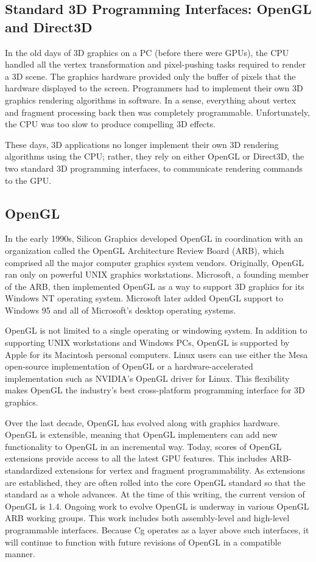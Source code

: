 \documentclass[../main.tex]{subfiles}
\begin{document}
\subsection{Standard 3D Programming Interfaces: OpenGL and Direct3D}

In the old days of 3D graphics on a PC (before there were GPUs), the CPU handled all the vertex transformation and pixel-pushing tasks required to render a 3D scene. The graphics hardware provided only the buffer of pixels that the hardware displayed to the screen. Programmers had to implement their own 3D graphics rendering algorithms in software. In a sense, everything about vertex and fragment processing back then was completely programmable. Unfortunately, the CPU was too slow to produce compelling 3D effects.

These days, 3D applications no longer implement their own 3D rendering algorithms using the CPU; rather, they rely on either OpenGL or Direct3D, the two standard 3D programming interfaces, to communicate rendering commands to the GPU.

\subsection*{OpenGL}
In the early 1990s, Silicon Graphics developed OpenGL in coordination with an organization called the OpenGL Architecture Review Board (ARB), which comprised all the major computer graphics system vendors. Originally, OpenGL ran only on powerful UNIX graphics workstations. Microsoft, a founding member of the ARB, then implemented OpenGL as a way to support 3D graphics for its Windows NT operating system. Microsoft later added OpenGL support to Windows 95 and all of Microsoft's desktop operating systems.

OpenGL is not limited to a single operating or windowing system. In addition to supporting UNIX workstations and Windows PCs, OpenGL is supported by Apple for its Macintosh personal computers. Linux users can use either the Mesa open-source implementation of OpenGL or a hardware-accelerated implementation such as NVIDIA's OpenGL driver for Linux. This flexibility makes OpenGL the industry's best cross-platform programming interface for 3D graphics.

Over the last decade, OpenGL has evolved along with graphics hardware. OpenGL is extensible, meaning that OpenGL implementers can add new functionality to OpenGL in an incremental way. Today, scores of OpenGL extensions provide access to all the latest GPU features. This includes ARB-standardized extensions for vertex and fragment programmability. As extensions are established, they are often rolled into the core OpenGL standard so that the standard as a whole advances. At the time of this writing, the current version of OpenGL is 1.4. Ongoing work to evolve OpenGL is underway in various OpenGL ARB working groups. This work includes both assembly-level and high-level programmable interfaces. Because Cg operates as a layer above such interfaces, it will continue to function with future revisions of OpenGL in a compatible manner.
\end{document}
